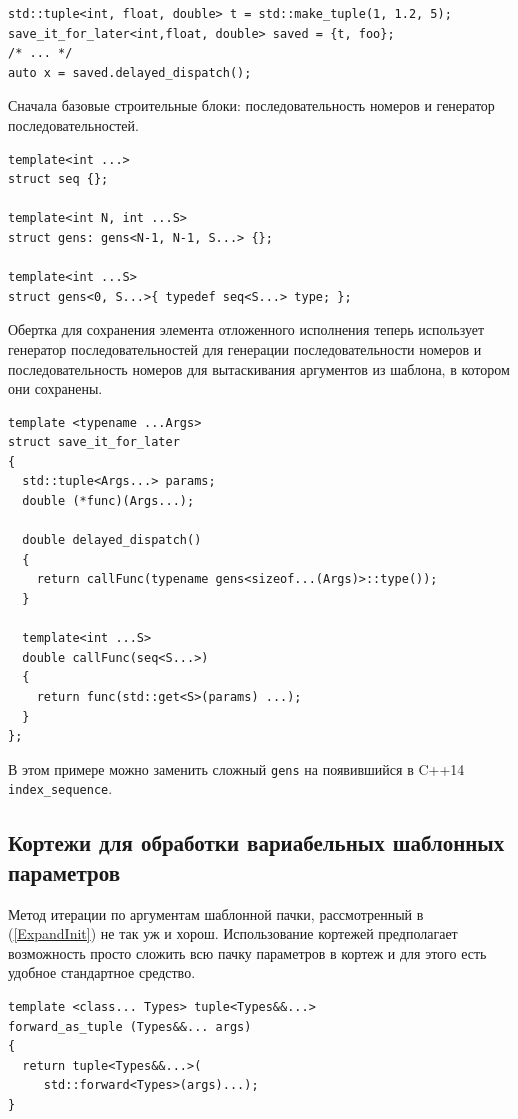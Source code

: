 \documentclass[a4paper,12pt,oneside]{book}
\begin{document}
\begin{lstlisting}
std::tuple<int, float, double> t = std::make_tuple(1, 1.2, 5);
save_it_for_later<int,float, double> saved = {t, foo};
/* ... */
auto x = saved.delayed_dispatch();
\end{lstlisting}

Сначала базовые строительные блоки: последовательность номеров и генератор последовательностей.

\begin{lstlisting}
template<int ...> 
struct seq {};

template<int N, int ...S> 
struct gens: gens<N-1, N-1, S...> {};

template<int ...S> 
struct gens<0, S...>{ typedef seq<S...> type; };
\end{lstlisting}

Обертка для сохранения элемента отложенного исполнения теперь использует генератор последовательностей для генерации последовательности номеров и последовательность номеров для вытаскивания аргументов из шаблона, в котором они сохранены.

\begin{lstlisting}
template <typename ...Args>
struct save_it_for_later
{
  std::tuple<Args...> params;
  double (*func)(Args...);

  double delayed_dispatch()
  {
    return callFunc(typename gens<sizeof...(Args)>::type());
  }

  template<int ...S>
  double callFunc(seq<S...>)
  {
    return func(std::get<S>(params) ...);
  }
};
\end{lstlisting}

В этом примере можно заменить сложный \lstinline!gens! на появившийся в C++14 \lstinline!index_sequence!.

\subsection{Кортежи для обработки вариабельных шаблонных параметров}\label{ExpandTuple}

Метод итерации по аргументам шаблонной пачки, рассмотренный в (\ref{ExpandInit}) не так уж и хорош. Использование кортежей предполагает возможность просто сложить всю пачку параметров в кортеж и для этого есть удобное стандартное средство.

\begin{lstlisting}
template <class... Types> tuple<Types&&...> 
forward_as_tuple (Types&&... args)
{
  return tuple<Types&&...>(
     std::forward<Types>(args)...);
} 
\end{lstlisting}
\end{document}
